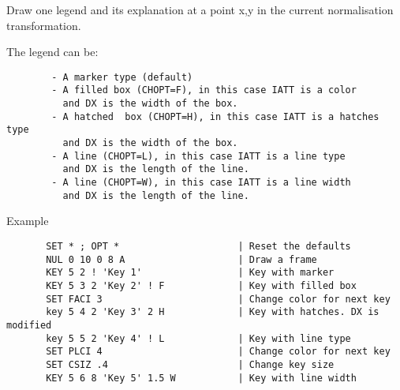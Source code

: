    \par
Draw one legend and its explanation at a point x,y in the current 
   normalisation transformation.  

   \par
The legend can be:  
\begin{verbatim}
        - A marker type (default)
        - A filled box (CHOPT=F), in this case IATT is a color
          and DX is the width of the box.
        - A hatched  box (CHOPT=H), in this case IATT is a hatches type
          and DX is the width of the box.
        - A line (CHOPT=L), in this case IATT is a line type
          and DX is the length of the line.
        - A line (CHOPT=W), in this case IATT is a line width
          and DX is the length of the line.
\end{verbatim}
\ENDVERB
   \par
Example 
\begin{verbatim}
       SET * ; OPT *                     | Reset the defaults
       NUL 0 10 0 8 A                    | Draw a frame
       KEY 5 2 ! 'Key 1'                 | Key with marker
       KEY 5 3 2 'Key 2' ! F             | Key with filled box
       SET FACI 3                        | Change color for next key
       key 5 4 2 'Key 3' 2 H             | Key with hatches. DX is modified
       key 5 5 2 'Key 4' ! L             | Key with line type
       SET PLCI 4                        | Change color for next key
       SET CSIZ .4                       | Change key size
       KEY 5 6 8 'Key 5' 1.5 W           | Key with line width
\end{verbatim}

\ENDCMD


\BEGARG
{}
\ENDARG
{}
\ENDOPT

